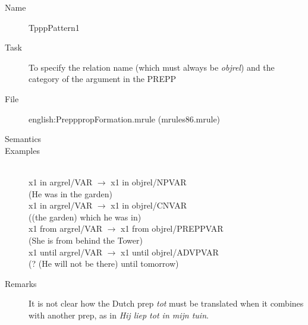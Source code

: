 \begin{description}
\vspace{1 cm}
\begin{description}
\item[Name] TpppPattern1
\item[Task] To specify the relation name (which must always be {\em objrel\/})
and the category of the argument in the PREPP 
\item[File] english:PrepppropFormation.mrule (mrules86.mrule)
\item[Semantics]
\item[Examples] \mbox{}\\
x1 in argrel/VAR $\rightarrow$ x1 in objrel/NPVAR\\
 (He was in the garden)\\
x1 in argrel/VAR $\rightarrow$ x1 in objrel/CNVAR \\
((the garden) which he was in)\\
x1 from  argrel/VAR $\rightarrow$ x1 from objrel/PREPPVAR\\ 
(She is from behind the Tower)\\
x1 until argrel/VAR $\rightarrow$ x1 until objrel/ADVPVAR \\
(? (He will not be there) until tomorrow)
\item[Remarks] It is not clear how the Dutch prep {\em tot\/} must be 
translated when it combines with another prep, as in {\em Hij liep tot in mijn 
tuin\/}. 
\end{description}

\end{description}

\newpage
